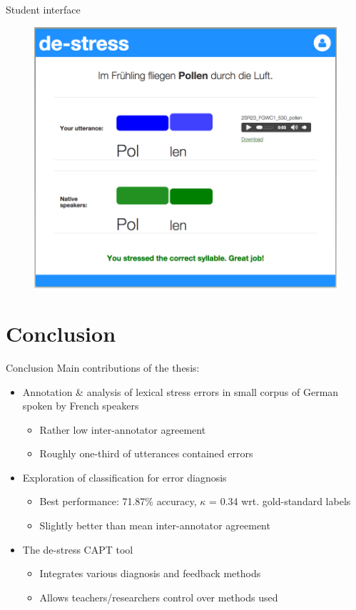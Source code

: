 \documentclass[xcolor={dvipsnames}]{beamer}
\begin{document}
		\begin{frame}{Student interface}
		\begin{figure}
		\includegraphics[height=.85\textheight]{../img/screenshots/StudentInterface-userIcon}
		\end{figure}
		\end{frame}
		
\section{Conclusion}
		\begin{frame}{Conclusion}
		Main contributions of the thesis:
		\begin{itemize}
		\pause
		\item Annotation \& analysis of lexical stress errors in small corpus of German spoken by French speakers
			\begin{itemize}
			\item Rather low inter-annotator agreement
			\item Roughly one-third of utterances contained errors
			\end{itemize}
			
		\pause
		\item Exploration of classification for error diagnosis
			\begin{itemize}
			\item Best performance: 71.87\% accuracy, $\kappa$ = 0.34 wrt. gold-standard labels
			\item Slightly better than mean inter-annotator agreement
			\end{itemize}
		
		\pause
		\item The de-stress CAPT tool
			\begin{itemize}
			\item Integrates various diagnosis and feedback methods
			\item Allows teachers/researchers control over methods used
			\end{itemize}
		\end{itemize}
		\end{frame}

%	
\end{document}
